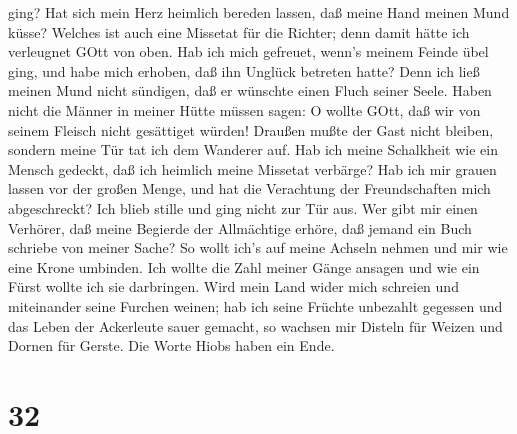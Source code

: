 ging?  Hat sich mein Herz heimlich bereden lassen, daß
meine Hand meinen Mund küsse?  Welches ist auch eine
Missetat für die Richter; denn damit hätte ich verleugnet GOtt von oben.
 Hab ich mich gefreuet, wenn's meinem Feinde übel ging, und
habe mich erhoben, daß ihn Unglück betreten hatte?  Denn
ich ließ meinen Mund nicht sündigen, daß er wünschte einen Fluch seiner
Seele.  Haben nicht die Männer in meiner Hütte müssen
sagen: O wollte GOtt, daß wir von seinem Fleisch nicht gesättiget
würden!  Draußen mußte der Gast nicht bleiben, sondern
meine Tür tat ich dem Wanderer auf.  Hab ich meine
Schalkheit wie ein Mensch gedeckt, daß ich heimlich meine Missetat
verbärge?  Hab ich mir grauen lassen vor der großen Menge,
und hat die Verachtung der Freundschaften mich abgeschreckt? Ich blieb
stille und ging nicht zur Tür aus.  Wer gibt mir einen
Verhörer, daß meine Begierde der Allmächtige erhöre, daß jemand ein Buch
schriebe von meiner Sache?  So wollt ich's auf meine
Achseln nehmen und mir wie eine Krone umbinden.  Ich wollte
die Zahl meiner Gänge ansagen und wie ein Fürst wollte ich sie
darbringen.  Wird mein Land wider mich schreien und
miteinander seine Furchen weinen;  hab ich seine Früchte
unbezahlt gegessen und das Leben der Ackerleute sauer gemacht,
 so wachsen mir Disteln für Weizen und Dornen für Gerste.
Die Worte Hiobs haben ein Ende.

\hypertarget{section-31}{%
\section{32}\label{section-31}}


